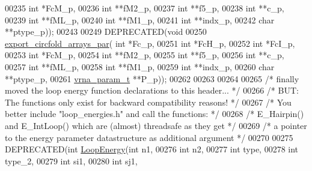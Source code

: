 \begin{DoxyCode}
00235                         \textcolor{keywordtype}{int} *FcM\_p,
00236                         \textcolor{keywordtype}{int} **fM2\_p,
00237                         \textcolor{keywordtype}{int} **f5\_p,
00238                         \textcolor{keywordtype}{int} **c\_p,
00239                         \textcolor{keywordtype}{int} **fML\_p,
00240                         \textcolor{keywordtype}{int} **fM1\_p,
00241                         \textcolor{keywordtype}{int} **indx\_p,
00242                         \textcolor{keywordtype}{char} **ptype\_p));
00243 
00249 DEPRECATED(\textcolor{keywordtype}{void}
00250 \hyperlink{group__mfe__fold__single_ga004bb901e7fd2f8d5ae68f9530318ce1}{export\_circfold\_arrays\_par}( \textcolor{keywordtype}{int} *Fc\_p,
00251                             \textcolor{keywordtype}{int} *FcH\_p,
00252                             \textcolor{keywordtype}{int} *FcI\_p,
00253                             \textcolor{keywordtype}{int} *FcM\_p,
00254                             \textcolor{keywordtype}{int} **fM2\_p,
00255                             \textcolor{keywordtype}{int} **f5\_p,
00256                             \textcolor{keywordtype}{int} **c\_p,
00257                             \textcolor{keywordtype}{int} **fML\_p,
00258                             \textcolor{keywordtype}{int} **fM1\_p,
00259                             \textcolor{keywordtype}{int} **indx\_p,
00260                             \textcolor{keywordtype}{char} **ptype\_p,
00261                             \hyperlink{group__energy__parameters_structvrna__param__s}{vrna\_param\_t} **P\_p));
00262 
00263 
00264 
00265 \textcolor{comment}{/* finally moved the loop energy function declarations to this header...  */}
00266 \textcolor{comment}{/* BUT: The functions only exist for backward compatibility reasons!      */}
00267 \textcolor{comment}{/* You better include "loop\_energies.h" and call the functions:           */}
00268 \textcolor{comment}{/* E\_Hairpin() and E\_IntLoop() which are (almost) threadsafe as they get  */}
00269 \textcolor{comment}{/* a pointer to the energy parameter datastructure as additional argument */}
00270 
00275 DEPRECATED(\textcolor{keywordtype}{int} \hyperlink{group__mfe__fold__single_ga2163034a25c6115d894b199e97e03f6c}{LoopEnergy}(\textcolor{keywordtype}{int} n1,
00276                           \textcolor{keywordtype}{int} n2,
00277                           \textcolor{keywordtype}{int} type,
00278                           \textcolor{keywordtype}{int} type\_2,
00279                           \textcolor{keywordtype}{int} si1,
00280                           \textcolor{keywordtype}{int} sj1,

\end{DoxyCode}
